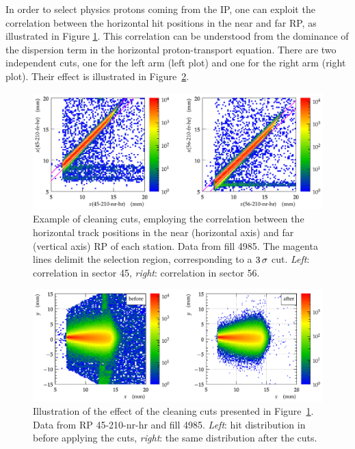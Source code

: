 \documentclass[TOTEM]{cern/cernphprep}
\def\un#1{\,{\rm #1}}
\begin{document}
In order to select physics protons coming from the IP, one can exploit the correlation between the horizontal hit positions in the near and far RP, as illustrated in Figure \ref{fig:hor_cuts}. This correlation can be understood from the dominance of the dispersion term in the horizontal proton-transport equation. There are two independent cuts, one for the left arm (left plot) and one for the right arm (right plot). Their effect is illustrated in Figure~\ref{fig:hor_cuts_effect}.

\begin{figure}[h!]
\begin{center}
\includegraphics[width=0.7\hsize]{fig/physics_fills/hor_cuts.pdf}
\caption{%
Example of cleaning cuts, employing the correlation between the horizontal track positions in the near (horizontal axis) and far (vertical axis) RP of each station. Data from fill 4985. The magenta lines delimit the selection region, corresponding to a $3\un{\sigma}$ cut. {\it Left}: correlation in sector 45, {\it right}: correlation in sector 56.
}
\label{fig:hor_cuts}
\end{center}
\end{figure}


\begin{figure}[h!]
\begin{center}
\includegraphics[width=0.7\hsize]{fig/physics_fills/hor_cuts_effect_cmp.pdf}
\caption{%
Illustration of the effect of the cleaning cuts presented in Figure~\ref{fig:hor_cuts}. Data from RP 45-210-nr-hr and fill 4985. {\it Left}: hit distribution in before applying the cuts, {\it right}: the same distribution after the cuts.
}
\label{fig:hor_cuts_effect}
\end{center}
\end{figure}
\end{document}
